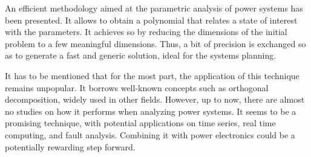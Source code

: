 An efficient methodology aimed at the parametric analysis of power systems has been presented. It allows to obtain a polynomial that relates a state of interest with the parameters. It achieves so by reducing the dimensions of the initial problem to a few meaningful dimensions. Thus, a bit of precision is exchanged so as to generate a fast and generic solution, ideal for the systems planning. 

It has to be mentioned that for the most part, the application of this technique remains unpopular. It borrows well-known concepts such as orthogonal decomposition, widely used in other fields. However, up to now, there are almost no studies on how it performs when analyzing power systems. It seems to be a promising technique, with potential applications on time series, real time computing, and fault analysis. Combining it with power electronics could be a potentially rewarding step forward.  
